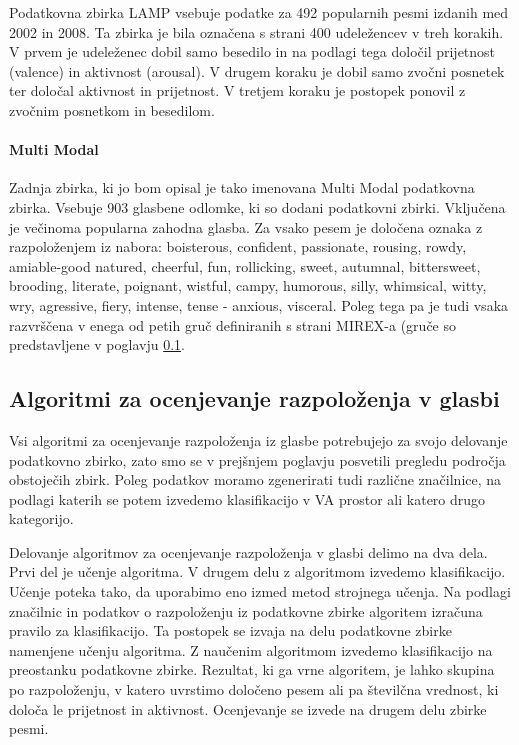 \documentclass[a4paper, 12pt]{book}
\begin{document}
{Podatkovna zbirka LAMP \cite{chu2010lamp} vsebuje podatke za 492 popularnih pesmi izdanih med 2002 in 2008. Ta zbirka je bila označena s strani 400 udeležencev v treh korakih. V prvem je udeleženec dobil samo besedilo in  na podlagi tega določil prijetnost (valence) in aktivnost (arousal). V drugem koraku je dobil samo zvočni posnetek ter določal aktivnost in prijetnost. V tretjem koraku je postopek ponovil z zvočnim posnetkom in besedilom.

\paragraph{Multi Modal}

Zadnja zbirka, ki jo bom opisal je tako imenovana Multi Modal \cite{panda2013multi} podatkovna zbirka. Vsebuje 903 glasbene odlomke, ki so dodani podatkovni zbirki. Vključena je večinoma popularna zahodna glasba. Za vsako pesem je določena oznaka z razpoloženjem iz nabora: boisterous, confident, passionate, rousing, rowdy, amiable-good natured, cheerful, fun, rollicking, sweet, autumnal, bittersweet, brooding, literate, poignant, wistful, campy, humorous, silly, whimsical, witty, wry, agressive, fiery, intense, tense - anxious, visceral. Poleg tega pa je tudi vsaka razvrščena v enega od petih gruč definiranih s strani MIREX-a (gruče so predstavljene v poglavju \ref{algoritmisp}. 

\subsection{Algoritmi za ocenjevanje razpoloženja v glasbi} 
\label{algoritmisp}

Vsi algoritmi za ocenjevanje razpoloženja iz glasbe potrebujejo za svojo delovanje podatkovno zbirko, zato smo se v prejšnjem poglavju posvetili pregledu področja obstoječih zbirk. Poleg podatkov moramo zgenerirati tudi različne značilnice, na podlagi katerih se potem izvedemo klasifikacijo v VA prostor ali katero drugo kategorijo.

Delovanje algoritmov za ocenjevanje razpoloženja v glasbi delimo na dva dela. Prvi del je učenje algoritma. V drugem delu z algoritmom  izvedemo klasifikacijo. Učenje poteka tako, da uporabimo eno izmed metod strojnega učenja. Na podlagi značilnic in podatkov o razpoloženju iz podatkovne zbirke algoritem izračuna pravilo za klasifikacijo. Ta postopek se izvaja na delu podatkovne zbirke namenjene učenju algoritma. Z naučenim algoritmom izvedemo klasifikacijo na preostanku podatkovne zbirke. Rezultat, ki ga vrne algoritem, je lahko skupina po razpoloženju, v katero uvrstimo določeno pesem ali pa številčna vrednost, ki določa le prijetnost in aktivnost. Ocenjevanje se izvede na drugem delu zbirke pesmi. 

}
\end{document}
